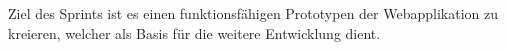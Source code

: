 Ziel des Sprints ist es einen funktionsfähigen Prototypen der Webapplikation zu kreieren, welcher als Basis für die weitere Entwicklung dient.
